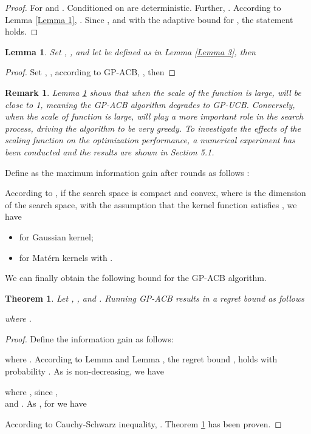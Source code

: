 \documentclass[10pt]{article}
\theoremstyle{plain}
\newtheorem{lemma}{Lemma}
\newtheorem{remark}{Remark}
\newtheorem{theorem}{Theorem}
\begin{document}
\begin{proof} \renewcommand{\qedsymbol}{}
For  and . Conditioned on  are deterministic. Further, . According to Lemma \ref{Lemma 1}, . Since , and with the adaptive bound for , the statement holds.
\end{proof}

\begin{lemma}
\label{Lemma 4}
Set , , and let  be defined as in Lemma \ref{Lemma 3}, then 

\end{lemma}

\begin{proof} \renewcommand{\qedsymbol}{}
Set , , according to GP-ACB, , then

\end{proof}

\begin{remark}
\label{remark lemma 4}
Lemma \ref{Lemma 4} shows that when the scale of the function  is large,  will be close to 1, meaning the GP-ACB algorithm degrades to GP-UCB. Conversely, when the scale of function is large,  will play a more important role in the search process, driving the algorithm to be very greedy. To investigate the effects of the scaling function on the optimization performance, a numerical experiment has been conducted and the results are shown in Section 5.1.
\end{remark}

Define  as the maximum information gain after  rounds as follows \cite{Niranjan2009}:

According to  \cite{Niranjan2009}, if the search space  is compact and convex, where  is the dimension of the search space, with the assumption that the kernel function satisfies , we have 
\begin{itemize}
\item  for Gaussian kernel;
\item  for Mat\'{e}rn kernels with .
\end{itemize}
We can finally obtain the following bound for the GP-ACB algorithm.

\begin{theorem}
\label{theorem 1}
Let ,  ,  and . Running GP-ACB results in a regret bound as follows

where .
\end{theorem}

\begin{proof} \renewcommand{\qedsymbol}{}
Define the information gain  as follows:

where . According to Lemma  and Lemma , the regret bound ,  holds with probability . As  is non-decreasing, we have 

where , since , \\ and . As , for  we have

According to Cauchy-Schwarz inequality, . Theorem \ref{theorem 1} has been proven.
\end{proof}
\end{document}
